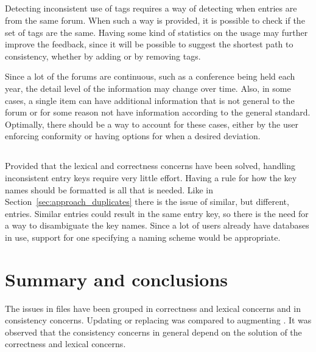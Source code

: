 \subsection{}

Detecting inconsistent use of tags requires a way of detecting when
entries are from the same forum.  When such a way is provided, it is
possible to check if the set of tags are the same.  Having some kind
of statistics on the usage may further improve the feedback, since it
will be possible to suggest the shortest path to consistency, whether
by adding or by removing tags.

Since a lot of the forums are continuous, such as a conference being
held each year, the detail level of the information may change over
time.  Also, in some cases, a single item can have additional
information that is not general to the forum or for some reason not
have information according to the general standard.  Optimally, there
should be a way to account for these cases, either by the user
enforcing conformity or having options for when a desired deviation.


\subsection{}

Provided that the lexical and correctness concerns have been solved,
handling inconsistent entry keys require very little effort.  Having a
rule for how the key names should be formatted is all that is needed.
Like in Section~\ref{sec:approach_duplicates} there is the issue of
similar, but different, entries.  Similar entries could result in the
same entry key, so there is the need for a way to disambiguate the key
names.  Since a lot of users already have databases in use, support
for one specifying a naming scheme would be appropriate.


\section{Summary and conclusions}

The issues in {\bibtex} files have been grouped in correctness and
lexical concerns and in consistency concerns.  Updating or replacing
{\bibtex} was compared to augmenting {\bibtex}.  It was observed that
the consistency concerns in general depend on the solution of the
correctness and lexical concerns.

